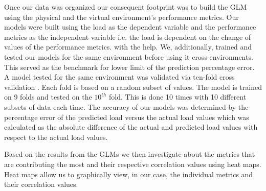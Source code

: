 Once our data was organized our consequent footprint was to build the GLM using the physical and the virtual environment's performance metrics. Our models were built using the load as the dependent variable and the performance metrics as the independent variable i.e. the load is dependent on the change of values of the performance metrics. with the help. We, additionally, trained and tested our models for the same environment before using it cross-environments. This served as the benchmark for lower limit of the prediction percentage error. A model tested for the same environment was validated via ten-fold cross validation \cite{Cross_Validation} \cite{kohavi1995study}. Each fold is based on a random subset of values. The model is trained on 9 folds and tested on the $10^{th}$ fold. This is done 10 times with 10 different subsets of data each time. The accuracy of our models was determined by the percentage error of the predicted load versus the actual load values which was calculated as the absolute difference of the actual and predicted load values with respect to the actual load values.

Based on the results from the GLMs we then investigate about the metrics that are contributing the most and their respective correlation values using heat maps. Heat maps allow us to graphically view, in our case, the individual metrics and their correlation values. 
